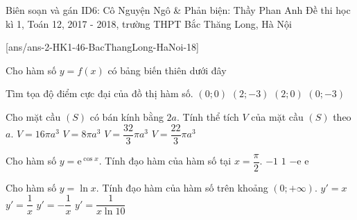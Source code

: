 
\begin{name}
{Biên soạn và gán ID6: Cô Nguyện Ngô \& Phản biện: Thầy Phan Anh}
{Đề thi học kì 1, Toán 12, 2017 - 2018, trường THPT Bắc Thăng Long, Hà Nội}
\end{name}
\setcounter{ex}{0}\setcounter{bt}{0}
[ans/ans-2-HK1-46-BacThangLong-HaNoi-18]

\begin{ex}%
Cho hàm số $y=f(x)$ có bảng biến thiên dưới đây
\begin{center}
\end{center}
Tìm tọa độ điểm cực đại của đồ thị hàm số.
\choice
{\True $(0; 0)$}
{$(2; -3)$}
{$(2; 0)$}
{$(0; -3)$}
\end{ex}

\begin{ex}%
Cho mặt cầu $(S)$ có bán kính bằng $2a$. Tính thể tích $V$ của mặt cầu $(S)$ theo $a$.
\choice
{$V=16\pi a^3$}
{$V=8\pi a^3$}
{\True $V=\dfrac{32}{3}\pi a^3$}
{$V=\dfrac{22}{3}\pi a^3$}
\end{ex}

\begin{ex}%
Cho hàm số $y=\mathrm{e}^{\cos x}$. Tính đạo hàm của hàm số tại $x=\dfrac{\pi}{2}$.
\choice
{\True $-1$}
{$1$}
{$-\mathrm{e}$}
{$\mathrm{e}$}
\end{ex}

\begin{ex}%
Cho hàm số $y=\ln x$. Tính đạo hàm của hàm số trên khoảng $(0; +\infty)$.
\choice
{$y'=x$}
{\True $y'=\dfrac{1}{x}$}
{$y'=-\dfrac{1}{x}$}
{$y'=\dfrac{1}{x\ln10}$}
\end{ex}

